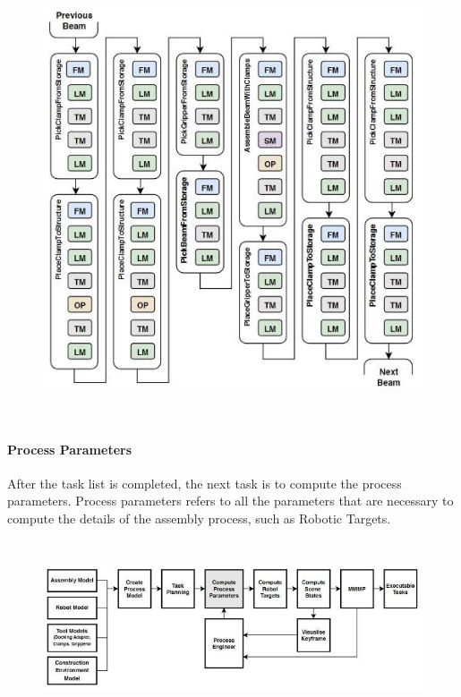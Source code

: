 \documentclass[11pt]{book}
\begin{document}
\begin{figure}[H]
\includegraphics[width=13.01cm,height=13.08cm]{./images/image24.jpeg}
\end{figure}


\paragraph{Process Parameters}

After the task list is completed, the next task is to compute the process parameters. Process parameters refers to all the parameters that are necessary to compute the details of the assembly process, such as Robotic Targets.

\begin{figure}[H]
\includegraphics[width=15.92cm,height=5.19cm]{./images/image25.jpeg}
\end{figure}
\end{document}
